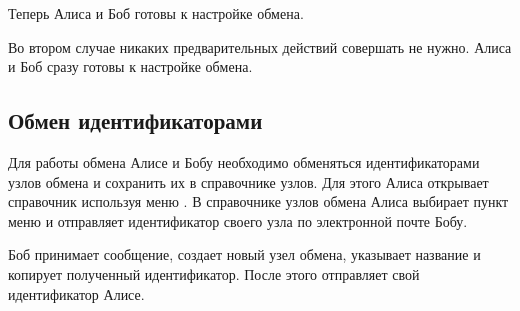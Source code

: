 \documentclass[a4paper,10pt,russian]{sphinxmanual}
\begin{document}
\noindent{}

\noindent{}

\sphinxAtStartPar
Теперь Алиса и Боб готовы к настройке обмена.

\sphinxAtStartPar
Во втором случае никаких предварительных действий совершать не нужно. Алиса и Боб сразу готовы к настройке обмена.


\subsection{Обмен идентификаторами}
\label{\detokenize{teamwork:id5}}
\sphinxAtStartPar
Для работы обмена Алисе и Бобу необходимо обменяться идентификаторами узлов обмена и сохранить их в справочнике узлов.
Для этого Алиса открывает справочник  используя меню . В справочнике
узлов обмена Алиса выбирает пункт меню  и отправляет идентификатор своего узла
по электронной почте Бобу.

\noindent{}

\noindent{}

\noindent{}

\noindent{}

\noindent{}

\noindent{}

\sphinxAtStartPar
Боб принимает сообщение, создает новый узел обмена, указывает название и копирует полученный идентификатор. После этого отправляет свой идентификатор Алисе.

\noindent{}

\noindent{}
\end{document}
